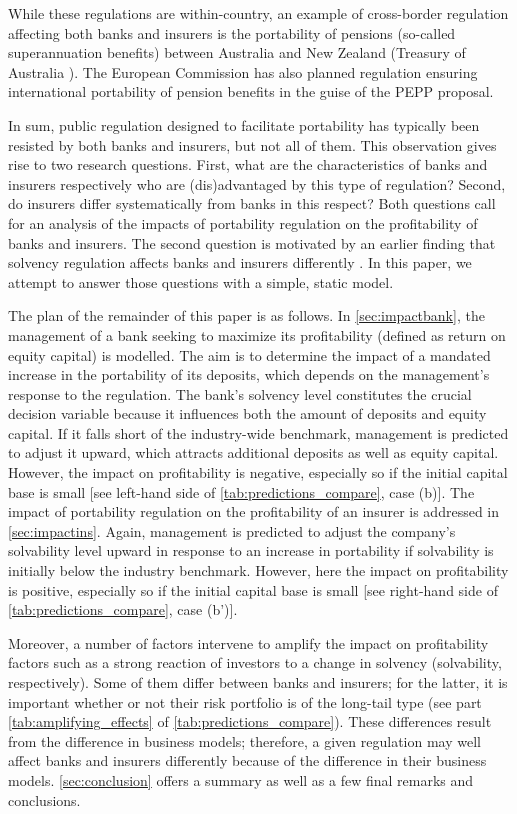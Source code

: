 While these regulations are within-country, an example of cross-border regulation affecting both banks and insurers is the portability of pensions (so-called superannuation benefits) between Australia and New Zealand (Treasury of Australia \cite{TreasuryofAustraliaSuperannuationZealand}). The European Commission \cite{EuropeanCommission2017ProposalProduct} has also planned regulation ensuring international portability of pension benefits in the guise of the \ac{PEPP} proposal.


In sum, public regulation designed to facilitate portability has typically been resisted by both banks and insurers, but not all of them.  This observation gives rise to two research questions. First, what are the characteristics of banks and insurers respectively who are (dis)advantaged by this type of regulation? Second, do insurers differ systematically from banks in this respect? Both questions call for an analysis of the impacts of portability regulation on the profitability of banks and insurers. The second question is motivated by an earlier finding that solvency regulation affects banks and insurers differently \cite{Zweifel2015}. In this paper, we attempt to answer those questions with a simple, static model.


The plan of the remainder of this paper is as follows. In \autoref{sec:impactbank}, the management of a bank seeking to maximize its profitability (defined as return on equity capital) is modelled. The aim is to determine the impact of a mandated increase in the portability of its deposits, which depends on the management's response to the regulation.  The bank's solvency level constitutes the crucial decision variable because it influences both the amount of deposits and equity capital. If it falls short of the industry-wide benchmark, management is predicted to adjust it upward, which attracts additional deposits as well as equity capital. However, the impact on profitability is negative, especially so if the initial capital base is small [see left-hand side of \autoref{tab:predictions_compare}, case (b)]. The impact of portability regulation on the profitability of an insurer is addressed in \autoref{sec:impactins}. Again, management is predicted to adjust the company's solvability level upward in response to an increase in portability if solvability is initially below the industry benchmark. However, here the impact on profitability is positive, especially so if the initial capital base is small [see right-hand side of \autoref{tab:predictions_compare}, case (b')].


Moreover, a number of factors intervene to amplify the impact on profitability factors such as a strong reaction of investors to a change in solvency (solvability, respectively). Some of them differ between banks and insurers; for the latter, it is important whether or not their risk portfolio is of the long-tail type (see part \ref{tab:amplifying_effects} of \autoref{tab:predictions_compare}). These differences result from the difference in business models; therefore, a given regulation may well affect banks and insurers differently because of the difference in their business models. \autoref{sec:conclusion} offers a summary as well as a few final remarks and conclusions.

